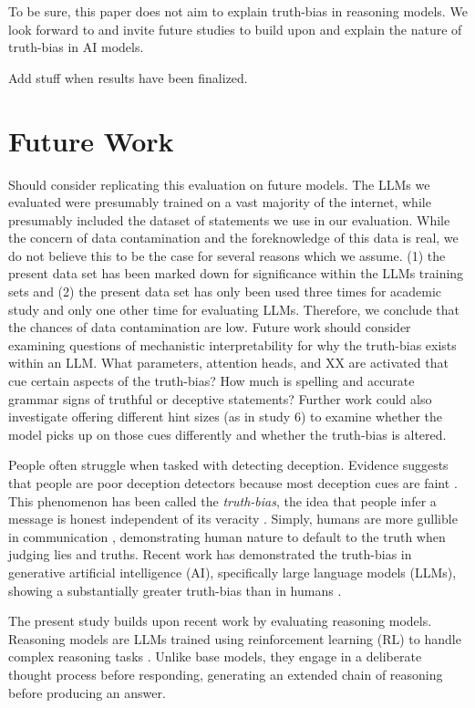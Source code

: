 \documentclass{article}
\begin{document}
To be sure, this paper does not aim to explain truth-bias in reasoning models. We look forward to and invite future studies to build upon and explain the nature of truth-bias in AI models.

Add stuff when results have been finalized.

\section{Future Work}

Should consider replicating this evaluation on future models. The LLMs we evaluated were presumably trained on a vast majority of the internet, while presumably included the dataset of statements we use in our evaluation. While the concern of data contamination and the foreknowledge of this data is real, we do not believe this to be the case for several reasons which we assume. (1) the present data set has been marked down for significance within the LLMs training sets and (2) the present data set has only been used three times for academic study and only one other time for evaluating LLMs. Therefore, we conclude that the chances of data contamination are low. Future work should consider examining questions of mechanistic interpretability for why the truth-bias exists within an LLM. What parameters, attention heads, and XX are activated that cue certain aspects of the truth-bias? How much is spelling and accurate grammar signs of truthful or deceptive statements? Further work could also investigate offering different hint sizes (as in study 6) to examine whether the model picks up on those cues differently and whether the truth-bias is altered. 

People often struggle when tasked with detecting deception. Evidence suggests that people are poor deception detectors because most deception cues are faint \citep{depaulo_cues_2003, hartwig_why_2011,luke_lessons_2019}. This phenomenon has been called the \textit{truth-bias}, the idea that people infer a message is honest independent of its veracity \citep{levine_truth-default_2014, mclaughlin_communication_2012}. Simply, humans are more gullible in communication \citep{levine_duped_2020}, demonstrating human nature to default to the truth when judging lies and truths. Recent work has demonstrated the truth-bias in generative artificial intelligence (AI), specifically large language models (LLMs), showing a substantially greater truth-bias than in humans \citep{markowitz_generative_2024}.

The present study builds upon recent work \citep{markowitz_generative_2024} by evaluating reasoning models. Reasoning models are LLMs trained using reinforcement learning (RL) to handle complex reasoning tasks \citep{openai_reasoning_2025}. Unlike base models, they engage in a deliberate thought process before responding, generating an extended chain of reasoning before producing an answer.
\end{document}

